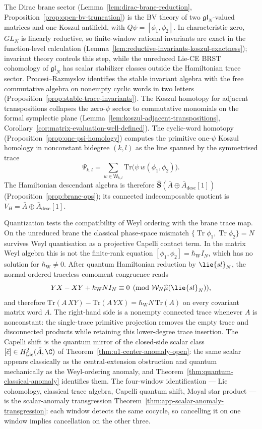 \documentclass[11pt]{memoir}
\begin{document}
The Dirac brane sector
(Lemma~\ref{lem:dirac-brane-reduction},
Proposition~\ref{prop:open-bv-truncation}) is the BV theory of two
\(\mathfrak{gl}_N\)-valued matrices and one Koszul antifield, with
\(Q\psi=[\phi_1,\phi_2]\).  In characteristic zero, \(GL_N\) is
linearly reductive, so finite-window rational invariants are exact in
the function-level calculation
(Lemma~\ref{lem:reductive-invariants-koszul-exactness}); invariant
theory controls this step, while the unreduced Lie-CE BRST cohomology
of \(\mathfrak{gl}_N\) has scalar stabilizer classes outside the
Hamiltonian trace sector.
Procesi--Razmyslov identifies the stable invariant algebra with the
free commutative algebra on nonempty cyclic words in two letters
  (Proposition~\ref{prop:stable-trace-invariants}).  The Koszul
  homotopy for adjacent transpositions collapses the zero-\(\psi\)
  sector to commutative monomials
on the formal symplectic plane
(Lemma~\ref{lem:koszul-adjacent-transpositions},
Corollary~\ref{cor:matrix-evaluation-well-defined}).  The
  cyclic-word homotopy
(Proposition~\ref{prop:one-psi-homology}) computes the primitive
one-\(\psi\) Koszul homology in nonconstant bidegree \((k,l)\) as
the line spanned by the symmetrised trace
\[
  \Psi_{k,l}
   =\sum_{w\in\mathsf W_{k,l}}
     \mathrm{Tr}\bigl(\psi\,w(\phi_1,\phi_2)\bigr).
\]
The Hamiltonian descendant algebra is therefore
\(\widehat{\mathbf S}(\bar A\oplus\bar A_{\mathrm{desc}}[1])\)
(Proposition~\ref{prop:brane-ops}); its connected indecomposable
quotient is \(V_H=\bar A\oplus\bar A_{\mathrm{desc}}[1]\).

Quantization tests the compatibility of Weyl ordering with the brane
trace map. On the unreduced brane the classical phase-space mismatch
\(\{\operatorname{Tr}\phi_1,\operatorname{Tr}\phi_2\}=N\) survives Weyl
quantisation as a projective Capelli contact term.  In the matrix Weyl
algebra this is not the finite-rank equation
\([\phi_1,\phi_2]=\hbar_{\mathrm{W}}I_N\), which has no solution for
\(\hbar_{\mathrm{W}}\ne0\).  After quantum Hamiltonian reduction by
\(\lie{sl}_N\), the normal-ordered traceless comoment congruence reads
\[
  YX-XY+\hbar_{\mathrm{W}}N I_N\equiv 0
   \pmod{\mathcal W_N\widehat\mu(\lie{sl}_N)},
\]
and therefore
\(\mathrm{Tr}(A\,XY)-\mathrm{Tr}(A\,YX)
  =\hbar_{\mathrm{W}}N\,\mathrm{Tr}(A)\)
on every covariant matrix word \(A\). The right-hand side is a
nonempty connected trace whenever \(A\) is nonconstant: the
single-trace primitive projection removes the empty trace and
disconnected products while retaining this lower-degree trace
insertion. The
Capelli shift is the quantum mirror of the closed-side scalar class
\([\bar c]\in H^2_{\mathrm{Lie}}(\bar A,\C)\) of
Theorem~\ref{thm:u1-center-anomaly-open}: the same scalar appears
classically as the central-extension obstruction and quantum
mechanically as the Weyl-ordering anomaly, and
Theorem~\ref{thm:quantum-classical-anomaly} identifies them. The
four-window identification --- Lie cohomology, classical trace
algebra, Capelli quantum shift, Moyal star product --- is the
scalar-anomaly transgression
Theorem~\ref{thm:app-scalar-anomaly-transgression}: each window
detects the same cocycle, so cancelling it on one window implies
cancellation on the other three.
\end{document}
